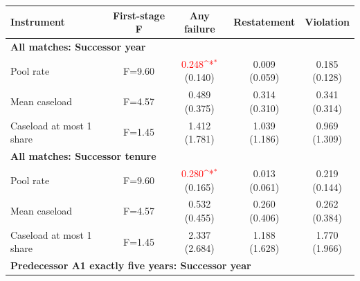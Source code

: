 \documentclass[10pt]{article}
\newcommand{\sym}[1]{\textsuperscript{#1}}
\begin{document}
\begin{minipage}{19cm}\fontsize{10}{12}\selectfont\setlength{\tabcolsep}{4pt}\renewcommand{\arraystretch}{1.12}


\def\sym#1{\ifmmode^{#1}\else\(^{#1}\)\fi}
\centering
{}
\begin{threeparttable}
\begin{tabular}{p{}cccc}
\toprule
Instrument & First-stage F & Any failure & Restatement & Violation \\
\midrule
\multicolumn{5}{l}{\textbf{All matches: Successor year}} \\
Pool rate & F=9.60 & \shortstack{\textcolor{red}{0.248\sym{*}}\\(0.140)} & \shortstack{0.009\\(0.059)} & \shortstack{0.185\\(0.128)} \\
Mean caseload & F=4.57 & \shortstack{0.489\\(0.375)} & \shortstack{0.314\\(0.310)} & \shortstack{0.341\\(0.314)} \\
Caseload at most 1 share & F=1.45 & \shortstack{1.412\\(1.781)} & \shortstack{1.039\\(1.186)} & \shortstack{0.969\\(1.309)} \\
\multicolumn{5}{l}{\textbf{All matches: Successor tenure}} \\
Pool rate & F=9.60 & \shortstack{\textcolor{red}{0.280\sym{*}}\\(0.165)} & \shortstack{0.013\\(0.061)} & \shortstack{0.219\\(0.144)} \\
Mean caseload & F=4.57 & \shortstack{0.532\\(0.455)} & \shortstack{0.260\\(0.406)} & \shortstack{0.262\\(0.384)} \\
Caseload at most 1 share & F=1.45 & \shortstack{2.337\\(2.684)} & \shortstack{1.188\\(1.628)} & \shortstack{1.770\\(1.966)} \\
\multicolumn{5}{l}{\textbf{Predecessor A1 exactly five years: Successor year}} \\

\end{tabular}
\end{threeparttable}
\end{minipage}
\end{document}
